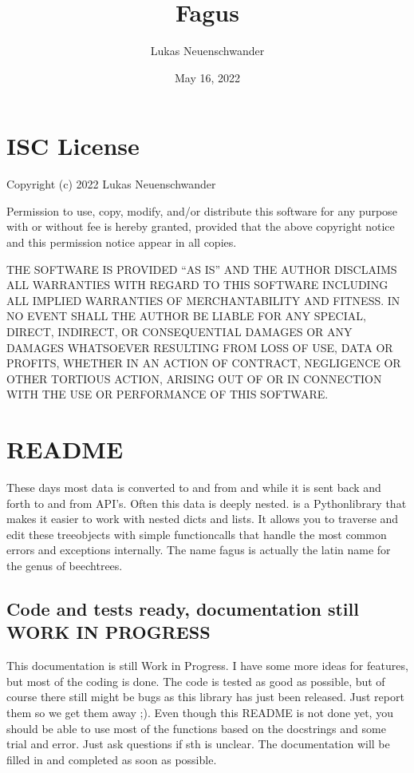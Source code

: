 \documentclass[a4paper,10pt,english]{sphinxmanual}
\title{Fagus}
\date{May 16, 2022}
\author{Lukas Neuenschwander}
\begin{document}
\pagestyle{empty}
\sphinxmaketitle
\pagestyle{plain}
\sphinxtableofcontents
\pagestyle{normal}
\label{\detokenize{index::doc}}


\sphinxstepscope


\chapter{ISC License}
\label{\detokenize{LICENSE:isc-license}}\label{\detokenize{LICENSE::doc}}
\sphinxAtStartPar
Copyright (c) 2022 Lukas Neuenschwander

\sphinxAtStartPar
Permission to use, copy, modify, and/or distribute this software for any purpose with or without fee is hereby granted, provided that the above copyright notice and this permission notice appear in all copies.

\sphinxAtStartPar
THE SOFTWARE IS PROVIDED “AS IS” AND THE AUTHOR DISCLAIMS ALL WARRANTIES WITH REGARD TO THIS SOFTWARE INCLUDING ALL IMPLIED WARRANTIES OF MERCHANTABILITY AND FITNESS. IN NO EVENT SHALL THE AUTHOR BE LIABLE FOR ANY SPECIAL, DIRECT, INDIRECT, OR CONSEQUENTIAL DAMAGES OR ANY DAMAGES WHATSOEVER RESULTING FROM LOSS OF USE, DATA OR PROFITS, WHETHER IN AN ACTION OF CONTRACT, NEGLIGENCE OR OTHER TORTIOUS ACTION, ARISING OUT OF OR IN CONNECTION WITH THE USE OR PERFORMANCE OF THIS SOFTWARE.

\sphinxstepscope


\chapter{README}
\label{\detokenize{README:readme}}\label{\detokenize{README::doc}}
\sphinxAtStartPar
These days most data is converted to and from  and  while it is sent back and forth to and from API’s. Often this data is deeply nested.  is a Python\sphinxhyphen{}library that makes it easier to work with nested dicts and lists. It allows you to traverse and edit these tree\sphinxhyphen{}objects with simple function\sphinxhyphen{}calls that handle the most common errors and exceptions internally. The name fagus is actually the latin name for the genus of beech\sphinxhyphen{}trees.


\section{Code and tests ready, documentation still WORK IN PROGRESS}
\label{\detokenize{README:code-and-tests-ready-documentation-still-work-in-progress}}
\sphinxAtStartPar
This documentation is still Work in Progress. I have some more ideas for features, but most of the coding is done. The code is tested as good as possible, but of course there still might be bugs as this library has just been released. Just report them so we get them away ;). Even though this README is not done yet, you should be able to use most of the functions based on the docstrings and some trial and error. Just ask questions  if sth is unclear. The documentation will be filled in and completed as soon as possible.
\end{document}
